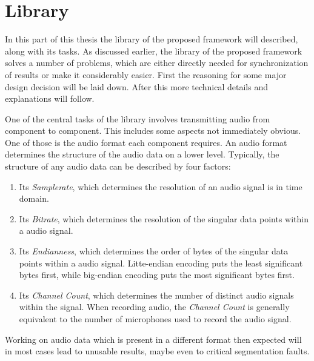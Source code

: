 


\section{Library}
\label{main:lib}
In this part of this thesis the library of the proposed framework will described, along with its tasks.
As discussed earlier, the library of the proposed framework solves a number of problems, which are either directly needed for synchronization of results or make it considerably easier.
First the reasoning for some major design decision will be laid down.
After this more technical details and explanations will follow.


One of the central tasks of the library involves transmitting audio from component to component.
This includes some aspects not immediately obvious.
One of those is the audio format each component requires.
An audio format determines the structure of the audio data on a lower level.
Typically, the structure of any audio data can be described by four factors:
\begin{enumerate}
	\item Its \textit{Samplerate}, which determines the resolution of an audio signal is in time domain.
	\item Its \textit{Bitrate}, which determines the resolution of the singular data points within a audio signal.
	\item Its \textit{Endianness}, which determines the order of bytes of the singular data points within a audio signal. Litte-endian encoding puts the least significant bytes first, while big-endian encoding puts the most significant bytes first. 
	\item Its \textit{Channel Count}, which determines the number of distinct audio signals within the signal. When recording audio, the \textit{Channel Count} is generally equivalent to the number of microphones used to record the audio signal.
\end{enumerate}
Working on audio data which is present in a different format then expected will in most cases lead to unusable results, maybe even to critical segmentation faults. 

